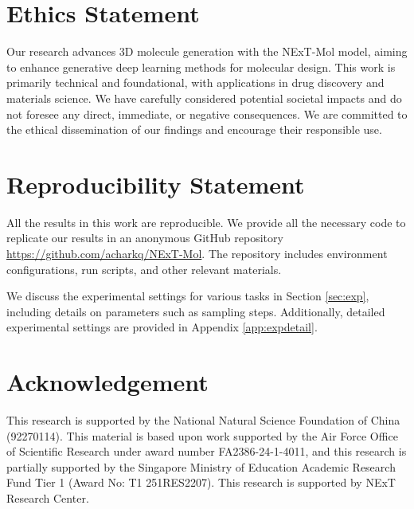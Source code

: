 \section{Ethics Statement}

Our research advances 3D molecule generation with the NExT-Mol model, aiming to enhance generative deep learning methods for molecular design. This work is primarily technical and foundational, with applications in drug discovery and materials science. We have carefully considered potential societal impacts and do not foresee any direct, immediate, or negative consequences. We are committed to the ethical dissemination of our findings and encourage their responsible use.

\section{Reproducibility Statement}

All the results in this work are reproducible. We provide all the necessary code to replicate our results in an anonymous GitHub repository \href{https://github.com/acharkq/NExT-Mol}{https://github.com/acharkq/NExT-Mol}.
The repository includes environment configurations, run scripts, and other relevant materials.

We discuss the experimental settings for various tasks in Section \ref{sec:exp}, including details on parameters such as sampling steps. Additionally, detailed experimental settings are provided in Appendix \ref{app:expdetail}.

\section*{Acknowledgement}
This research is supported by the National Natural Science Foundation of China (92270114). This material is based upon work supported by the Air Force Office of Scientific Research under award number FA2386-24-1-4011, and this research is partially supported by the Singapore Ministry of Education Academic Research Fund Tier 1 (Award No: T1 251RES2207). This research is supported by NExT Research Center. 